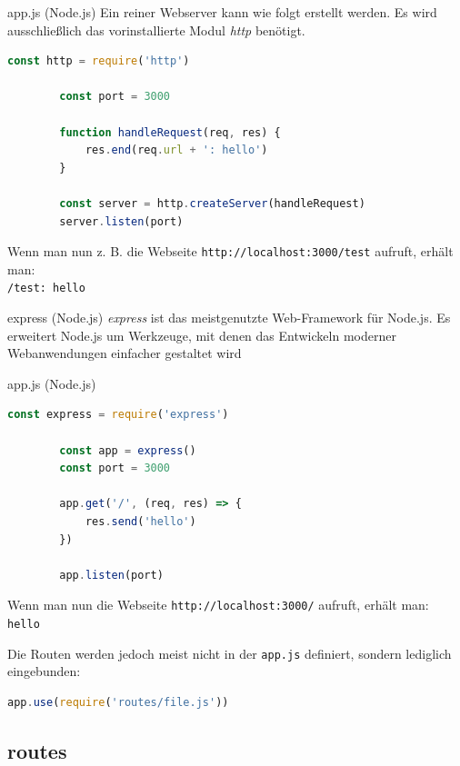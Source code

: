 \begin{example}{app.js (Node.js)}
    Ein reiner Webserver kann wie folgt erstellt werden.
    Es wird ausschließlich das vorinstallierte Modul \emph{http} benötigt.

    \begin{lstlisting}[language=JavaScript]
        const http = require('http')

        const port = 3000

        function handleRequest(req, res) {
            res.end(req.url + ': hello')
        }

        const server = http.createServer(handleRequest)
        server.listen(port)
    \end{lstlisting}

    Wenn man nun z. B. die Webseite \texttt{http://localhost:3000/test} aufruft, erhält man:\\
    \texttt{/test: hello}
\end{example}

\begin{defi}{express (Node.js)}
    \emph{express} ist das meistgenutzte Web-Framework für Node.js.
    Es erweitert Node.js um Werkzeuge, mit denen das Entwickeln moderner Webanwendungen einfacher gestaltet wird
\end{defi}

\begin{example}{app.js (Node.js)}
    \begin{lstlisting}[language=JavaScript]
        const express = require('express')
        
        const app = express()
        const port = 3000

        app.get('/', (req, res) => {
            res.send('hello')
        })

        app.listen(port)
    \end{lstlisting}

    Wenn man nun die Webseite \texttt{http://localhost:3000/} aufruft, erhält man:\\
    \texttt{hello}

    Die Routen werden jedoch meist nicht in der \texttt{app.js} definiert, sondern lediglich eingebunden:
    \begin{lstlisting}[language=JavaScript]
        app.use(require('routes/file.js'))
    \end{lstlisting}
\end{example}

\subsection{routes}

